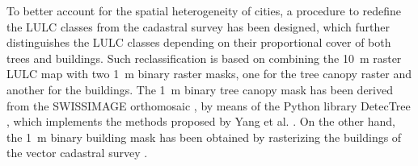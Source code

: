 \documentclass[10pt,letterpaper]{article}
\begin{document}
To better account for the spatial heterogeneity of cities, a procedure to redefine the LULC classes from the cadastral survey has been designed, which further distinguishes the LULC classes depending on their proportional cover of both trees and buildings. Such reclassification is based on combining the 10~m raster LULC map with two 1~m binary raster masks, one for the tree canopy raster and another for the buildings. %
The 1~m binary tree canopy mask has been derived from the SWISSIMAGE orthomosaic \cite{swisstopo2019swissimage}, by means of the Python library DetecTree \cite{bosch2020detectree}, which implements the methods proposed by Yang et al. \cite{yang2009tree}. On the other hand, the 1~m binary building mask has been obtained by rasterizing the buildings of the vector cadastral survey \cite{asitvd2018structure}.
\end{document}
